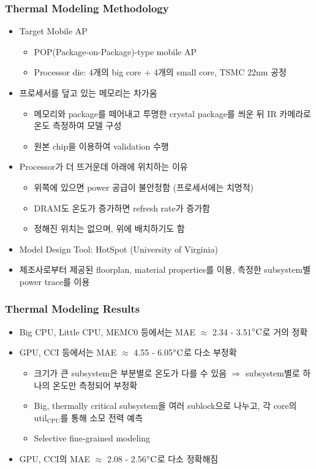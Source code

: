 \subsubsection*{Thermal Modeling Methodology}
\begin{itemize}
    \item Target Mobile AP
    \begin{itemize}
        \item POP(Package-on-Package)-type mobile AP
        \item Processor die: 4개의 big core + 4개의 small core, TSMC 22nm 공정
    \end{itemize}
    \item 프로세서를 덮고 있는 메모리는 차가움
    \begin{itemize}
        \item 메모리와 package를 떼어내고 투명한 crystal package를 씌운 뒤 IR 카메라로 온도 측정하여 모델 구성
        \item 원본 chip을 이용하여 validation 수행
    \end{itemize}
    \item Processor가 더 뜨거운데 아래에 위치하는 이유
    \begin{itemize}
        \item 위쪽에 있으면 power 공급이 불안정함 (프로세서에는 치명적)
        \item DRAM도 온도가 증가하면 refresh rate가 증가함
        \item 정해진 위치는 없으며, 위에 배치하기도 함
    \end{itemize}
    \item Model Design Tool: HotSpot (University of Virginia)
    \item 제조사로부터 제공된 floorplan, material properties를 이용, 측정한 subsystem별 power trace를 이용
\end{itemize}
\begin{figures}
\end{figures}

\subsubsection*{Thermal Modeling Results}
\begin{itemize}
    \item Big CPU, Little CPU, MEMC0 등에서는 MAE $\approx$ 2.34 - 3.51$^{\circ}\mathrm{C}$로 거의 정확
    \item GPU, CCI 등에서는 MAE $\approx$ 4.55 - 6.05$^{\circ}\mathrm{C}$로 다소 부정확
    \begin{itemize}
        \item 크기가 큰 subsystem은 부분별로 온도가 다를 수 있음 $\Rightarrow$ subsystem별로 하나의 온도만 측정되어 부정확
        \item Big, thermally critical subsystem을 여러 sublock으로 나누고, 각 core의 $\mathrm{util_{CPU}}$를 통해 소모 전력 예측
        \item Selective fine-grained modeling
    \end{itemize}
    \item GPU, CCI의 MAE $\approx$ 2.08 - 2.56$^{\circ}\mathrm{C}$로 다소 정확해짐
\end{itemize}

